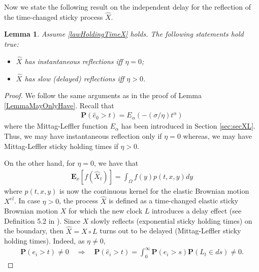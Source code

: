 \documentclass[11pt,a4paper]{article}
\newtheorem{lemma}{Lemma}
\begin{document}
Now we state the following result on the independent delay for the reflection of the time-changed sticky process $\hat{X}$.
\begin{lemma}
\label{LemmaMayOnlyHaveHat}
Assume \eqref{lawHoldingTimeX} holds. The following statements hold true:
\begin{itemize} 
\item[i)] $\hat{X}$ has instantaneous reflections iff $\eta=0$;
\item[ii)] $\hat{X}$ has slow (delayed) reflections iff $\eta>0$.
\end{itemize}
\end{lemma}
\begin{proof}
We follow the same arguments as in the proof of Lemma \ref{LemmaMayOnlyHave}. Recall that 
\begin{align*}
\mathbf{P}(\hat{e}_0 >t) = E_\alpha(-(\sigma/\eta) t^\alpha)
\end{align*}
where the Mittag-Leffler function $E_\alpha$ has been introduced in Section \ref{sec:secXL}. Thus, we may have instantaneous reflection only if $\eta=0$ whereas, we may have Mittag-Leffler sticky holding times if $\eta>0$.

On the other hand, for $\eta=0$, we have that
\begin{align*}
\mathbf{E}_x[f(\hat{X}_t)] = \int_{\Omega} f(y) p(t,x,y) dy
\end{align*}
where $p(t,x,y)$ is now the continuous kernel for the elastic Brownian motion $X^{el}$.
In case $\eta>0$, the process $\hat{X}$ is defined as a time-changed elastic sticky Brownian motion $X$ for which the new clock $L$ introduces a delay effect (see Definition 5.2 in \cite{CapDovDelRus17}). Since $X$ slowly reflects (exponential sticky holding times) on the boundary, then $\hat{X} = X \circ L$ turns out to be delayed (Mittag-Leffler sticky holding times). Indeed, as $\eta \neq 0$, 
\begin{align*}
\mathbf{P}(e_i >t) \neq 0 \quad \Rightarrow \quad \mathbf{P}(\hat{e}_i > t) = \int_0^\infty \mathbf{P}(e_i >s) \mathbf{P}(L_t \in ds) \neq 0.
\end{align*}
\end{proof}
\end{document}
